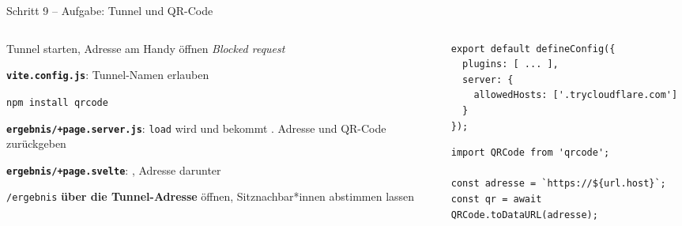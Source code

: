 \begin{frame}[fragile]{Schritt 9 -- Aufgabe: Tunnel und QR-Code}
  \footnotesize
  \begin{columns}[onlytextwidth,t]
    \begin{column}{0.54\textwidth}
      \begin{tugenumerate}
        \item Tunnel starten, Adresse am Handy öffnen \textarrow{} \emph{Blocked request}
        \item \textbf{\texttt{vite.config.js}}: Tunnel-Namen erlauben
        \item \texttt{npm install qrcode}
        \item \textbf{\texttt{ergebnis/+page.server.js}}: \texttt{load} wird 
              und bekommt . Adresse und QR-Code zurückgeben
        \item \textbf{\texttt{ergebnis/+page.svelte}}:
              , Adresse darunter
        \item \texttt{/ergebnis} \textbf{über die Tunnel-Adresse} öffnen,
              Sitznachbar*innen abstimmen lassen
      \end{tugenumerate}
    \end{column}
    \begin{column}{0.43\textwidth}
\begin{lstlisting}[style=jssm,numbers=none]
export default defineConfig({
  plugins: [ ... ],
  server: {
    allowedHosts: ['.trycloudflare.com']
  }
});
\end{lstlisting}
\begin{lstlisting}[style=jssm,numbers=none]
import QRCode from 'qrcode';

const adresse = `https://${url.host}`;
const qr = await QRCode.toDataURL(adresse);
\end{lstlisting}
    \end{column}
  \end{columns}
\end{frame}


